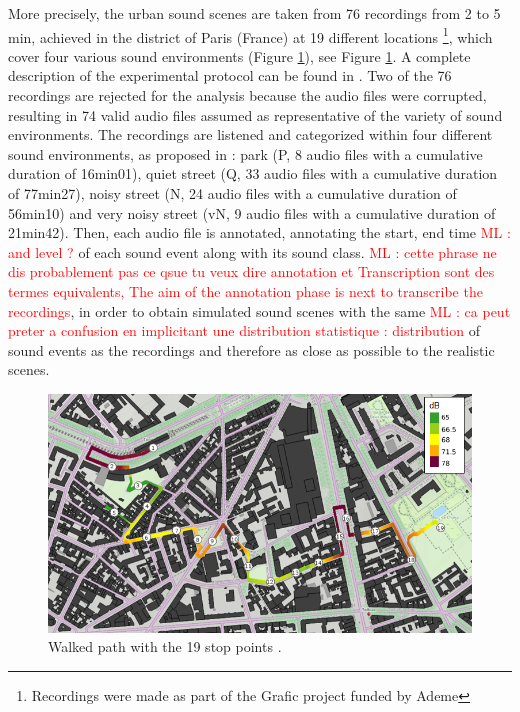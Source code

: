\documentclass[review,5p,twocolumn,sort&compress,times]{elsarticle}
\newcommand{\ml}[1]{\textcolor{red}{ML : #1}}
\begin{document}
More precisely, the urban sound scenes are taken from 76 recordings from 2 to 5 min, achieved in the  district of Paris (France) at 19 different locations \footnote{Recordings were made as part of the Grafic project funded by Ademe}, which cover four various sound environments (Figure \ref{fig:map_grafic}), see Figure \ref{fig:map_grafic}. A complete description of the experimental protocol can be found in \cite{aumond_modelling_2017}. Two of the 76 recordings are rejected for the analysis because the audio files were corrupted, resulting in 74 valid audio files assumed as representative of the variety of sound environments. The recordings are listened and categorized within four different sound environments, as proposed in \cite{can_describing_2015}: park (P, 8 audio files with a cumulative duration of 16min01), quiet street (Q, 33 audio files with a cumulative duration of 77min27), noisy street (N, 24 audio files with a cumulative duration of 56min10) and very noisy street (vN, 9 audio files with a cumulative duration of 21min42). Then, each audio file is annotated, annotating the start, end time \ml{and level ?} of each sound event along with its sound class. \ml{cette phrase ne dis probablement pas ce qsue tu veux dire annotation et Transcription sont des termes equivalents, The aim of the annotation phase is next to transcribe the recordings}, in order to obtain simulated sound scenes with the same \ml{ca peut preter a confusion en implicitant une distribution statistique : distribution} of sound events as the recordings and therefore as close as possible to the realistic scenes.

\begin{figure}[t]
\centering
\includegraphics[width=\linewidth]{./figures/trajet_19pts.png}
\caption{Walked path with the 19 stop points  \cite{aumond_modelling_2017}.}
\label{fig:map_grafic}
\end{figure}
\end{document}
